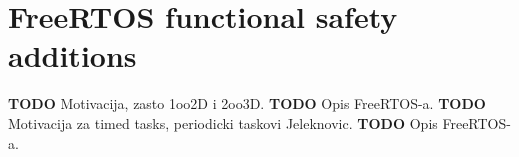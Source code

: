 \chapter{FreeRTOS functional safety additions}
\label{freertos_modification}

\textbf{TODO} Motivacija, zasto 1oo2D i 2oo3D. 
\textbf{TODO} Opis FreeRTOS-a.
\textbf{TODO} Motivacija za timed tasks, periodicki taskovi Jeleknovic.
\textbf{TODO} Opis FreeRTOS-a.